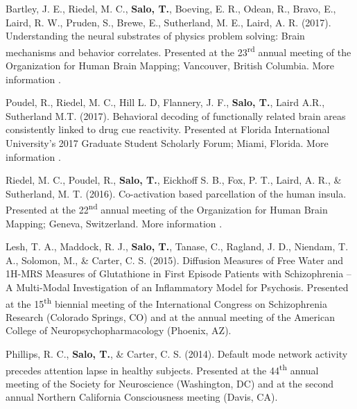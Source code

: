 \documentclass[10pt]{article}
\newcommand{\textlink}[3][blue]{\href{#2}{\color{#1}{#3}}}%
\begin{document}
\begin{hangparas}{.25in}{1}
Bartley, J. E., Riedel, M. C., \textbf{Salo, T.}, Boeving, E. R., Odean, R.,
Bravo, E., Laird, R. W., Pruden, S., Brewe, E., Sutherland, M. E., Laird, A. R.
(2017). Understanding the neural substrates of physics problem solving: Brain
mechanisms and behavior correlates. Presented at the 23\textsuperscript{rd}
annual meeting of the Organization for Human Brain Mapping; Vancouver, British
Columbia. More information
\textlink{https://nbclab.github.io/posters/bartley-physics-poster}{here}.

\bigskip

Poudel, R.,  Riedel, M. C., Hill L. D, Flannery, J. F., \textbf{Salo, T.},
Laird A.R., Sutherland M.T. (2017). Behavioral decoding of functionally related
brain areas consistently linked to drug cue reactivity. Presented at Florida
International University's 2017 Graduate Student Scholarly Forum; Miami, Florida.
More information
\textlink{https://nbclab.github.io/posters/poudel-cue-reactivity-poster}{here}.

\bigskip

Riedel, M. C., Poudel, R., \textbf{Salo, T.}, Eickhoff S. B., Fox, P. T.,
Laird, A. R., \& Sutherland, M. T. (2016). Co-activation based parcellation of
the human insula. Presented at the 22\textsuperscript{nd} annual meeting of the
Organization for Human Brain Mapping; Geneva, Switzerland. More information
\textlink{https://osf.io/pqvqy}{here}.

\bigskip

Lesh, T. A., Maddock, R. J., \textbf{Salo, T.}, Tanase, C., Ragland, J. D.,
Niendam, T. A., Solomon, M., \& Carter, C. S. (2015). Diffusion Measures of
Free Water and 1H-MRS Measures of Glutathione in First Episode Patients with
Schizophrenia -- A Multi-Modal Investigation of an Inflammatory Model for
Psychosis. Presented at the 15\textsuperscript{th} biennial meeting of the
International Congress on Schizophrenia Research (Colorado Springs, CO) and at
the annual meeting of the American College of Neuropsychopharmacology (Phoenix,
AZ).

\bigskip

Phillips, R. C., \textbf{Salo, T.}, \& Carter, C. S. (2014). Default mode
network activity precedes attention lapse in healthy subjects. Presented at
the 44\textsuperscript{th} annual meeting of the Society for Neuroscience
(Washington, DC) and at the second annual Northern California Consciousness
meeting (Davis, CA).
\end{hangparas}
\end{document}
